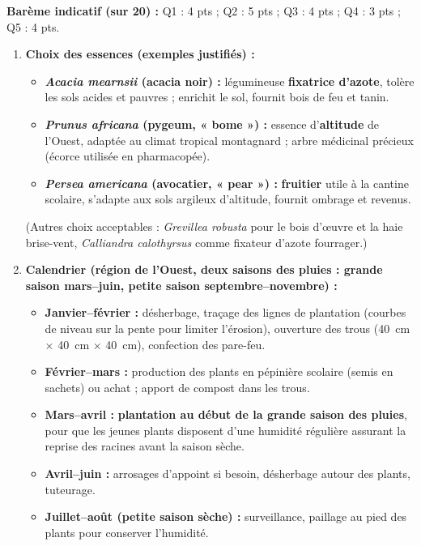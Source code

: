 \documentclass[11pt]{article}
\begin{document}
\begin{corrige}
\textbf{Barème indicatif (sur 20) :} Q1 : 4 pts ; Q2 : 5 pts ; Q3 : 4 pts ; Q4 : 3 pts ; Q5 : 4 pts.

\begin{enumerate}
    \item \textbf{Choix des essences (exemples justifiés) :}
    \begin{itemize}
        \item \textbf{\emph{Acacia mearnsii} (acacia noir) :} légumineuse \textbf{fixatrice d'azote}, tolère les sols acides et pauvres ; enrichit le sol, fournit bois de feu et tanin.
        \item \textbf{\emph{Prunus africana} (pygeum, « bome ») :} essence d'\textbf{altitude} de l'Ouest, adaptée au climat tropical montagnard ; arbre médicinal précieux (écorce utilisée en pharmacopée).
        \item \textbf{\emph{Persea americana} (avocatier, « pear ») :} \textbf{fruitier} utile à la cantine scolaire, s'adapte aux sols argileux d'altitude, fournit ombrage et revenus.
    \end{itemize}
    (Autres choix acceptables : \emph{Grevillea robusta} pour le bois d'œuvre et la haie brise-vent, \emph{Calliandra calothyrsus} comme fixateur d'azote fourrager.)
    \item \textbf{Calendrier (région de l'Ouest, deux saisons des pluies : grande saison mars--juin, petite saison septembre--novembre) :}
    \begin{itemize}
        \item \textbf{Janvier--février :} désherbage, traçage des lignes de plantation (courbes de niveau sur la pente pour limiter l'érosion), ouverture des trous (\SI{40}{cm} $\times$ \SI{40}{cm} $\times$ \SI{40}{cm}), confection des pare-feu.
        \item \textbf{Février--mars :} production des plants en pépinière scolaire (semis en sachets) ou achat ; apport de compost dans les trous.
        \item \textbf{Mars--avril :} \textbf{plantation au début de la grande saison des pluies}, pour que les jeunes plants disposent d'une humidité régulière assurant la reprise des racines avant la saison sèche.
        \item \textbf{Avril--juin :} arrosages d'appoint si besoin, désherbage autour des plants, tuteurage.
        \item \textbf{Juillet--août (petite saison sèche) :} surveillance, paillage au pied des plants pour conserver l'humidité.

\end{itemize}
\end{enumerate}
\end{corrige}
\end{document}

